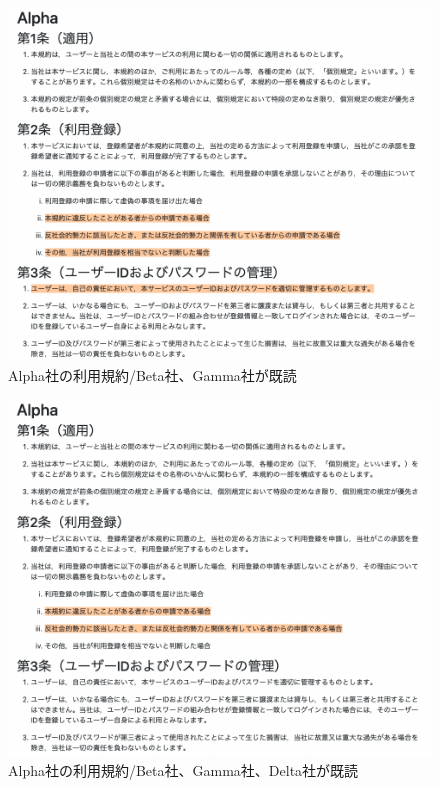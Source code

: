 \begin{figure}[h]
  \begin{center}
      \includegraphics[width=16cm]{img/alpha_bg.png}
      \caption{Alpha社の利用規約/Beta社、Gamma社が既読}
      \label{img:Alpha社の利用規約/Beta社、Gamma社が既読}
  \end{center}
\end{figure}
\begin{figure}[h]
  \begin{center}
      \includegraphics[width=16cm]{img/alpha_bgd.png}
      \caption{Alpha社の利用規約/Beta社、Gamma社、Delta社が既読}
      \label{img:Alpha社の利用規約/Beta社、Gamma社、Delta社が既読}
  \end{center}
\end{figure}
